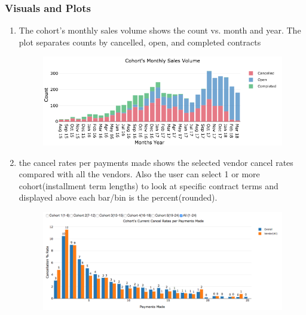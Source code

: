 \documentclass[titlepage]{article}
\begin{document}
\subsubsection{Visuals and Plots}
\begin{enumerate}
	\item The cohort's monthly sales volume shows the count vs. month and year. The plot separates counts by cancelled, open, and completed contracts
	\begin{figure}[h]
		\includegraphics[scale=.5]{./pics/monthly_sales_vol.png}
	\end{figure}
	\item the cancel rates per payments made shows the selected vendor cancel rates compared with all the vendors. Also the user can select 1 or more cohort(installment term lengths) to look at specific contract terms and displayed above each bar/bin is the percent(rounded).
	\begin{figure}[h]
		\includegraphics[scale=.4]{./pics/cancellation_rate_paymentMade.png}
	\end{figure}
\end{enumerate}

\newpage
\end{document}
